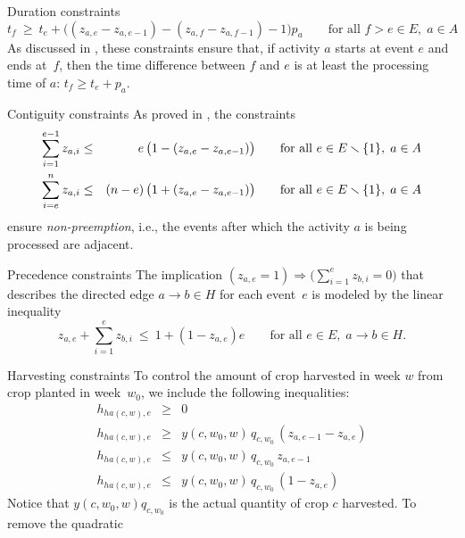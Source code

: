 \documentclass[11pt,reqno]{amsart}
\newcommand{\lra}{\longrightarrow}
\numberwithin{equation}{section}
\begin{document}
\begin{mydesc}
\item[Duration constraints]
  \begin{equation}
     t_f 
     \ \ge \
     t_e + \big((z_{a,e} - z_{a,e-1} ) - (z_{a,f} - z_{a,f-1}) - 1\big) p_a
     \qquad\text{for all } f>e\in E,\; a\in A
  \end{equation}
  As discussed in \cite{artigues-etal11}, these constraints ensure that,
if activity $a$ starts at event $e$ and ends at~$f$, then the time difference between  $f$
and $e$ is at least the processing time of $a$: $t_f \ge t_e + p_a$.

\item[Contiguity constraints] As proved in \cite[Proposition 1]{artigues-etal11a}, the
  constraints
  \begin{eqnarray}
    \sum_{i=1}^{e-1} z_{a,i}
    &\le&
    \phantom{(n-e)}\llap{$e$}\,\big(1-(z_{a,e} - z_{a,e-1})\big)
    \qquad\text{for all } e\in E\smallsetminus\{1\},\; a\in A
    \\
    \sum_{i=e}^n z_{a,i}
    &\le&
    (n-e)\,\big(1+(z_{a,e} - z_{a,e-1})\big)
    \qquad\text{for all } e\in E\smallsetminus\{1\},\; a\in A
  \end{eqnarray}
  ensure \emph{non-preemption}, i.e., the events after which the activity $a$ is being
  processed are adjacent.

\item[Precedence constraints] The implication $(z_{a,e}=1) \Longrightarrow
  \big(\sum_{i=1}^{e} z_{b,i}=0\big)$ that describes the directed edge $a\lra b\in H$ for
  each event~$e$ is modeled by the linear inequality
  \begin{equation}
     z_{a,e} + \sum_{i=1}^e z_{b,i}
     \ \le \
     1+(1-z_{a,e})e
     \qquad\text{for all } e\in E,\; a\lra b\in H.
  \end{equation}


\item[Harvesting constraints] To control the amount of crop harvested in week $w$ from
  crop planted in week~$w_0$, we include the following inequalities:
  \begin{eqnarray}
    h_{ha(c,w),e} &\ge& 0 \\
    h_{ha(c,w),e} &\ge& y(c,w_0,w)\, q_{c,w_0}\, (z_{a,e-1}-z_{a,e})\\
    h_{ha(c,w),e} &\le& y(c,w_0,w)\, q_{c,w_0}\, z_{a,e-1}\\    
    h_{ha(c,w),e} &\le& y(c,w_0,w)\, q_{c,w_0}\, (1-z_{a,e})
  \end{eqnarray}
  Notice that $y(c,w_0,w)q_{c,w_0}$ is the actual quantity of crop $c$ harvested. To
  remove the quadratic 
\end{mydesc}
\end{document}
